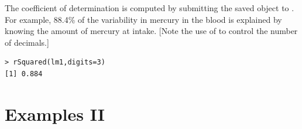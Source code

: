 \documentclass[10pt,openany]{book}\usepackage[]{graphicx}\usepackage[]{color}
\makeatletter
\newenvironment{kframe}{%
 \def\at@end@of@kframe{}%
 \ifinner\ifhmode%
  \def\at@end@of@kframe{\end{minipage}}%
  \begin{minipage}{\columnwidth}%
 \fi\fi%
 \def\FrameCommand##1{\hskip\@totalleftmargin \hskip-\fboxsep
 \colorbox{shadecolor}{##1}\hskip-\fboxsep
     \hskip-\linewidth \hskip-\@totalleftmargin \hskip\columnwidth}%
 \MakeFramed {\advance\hsize-\width
   \@totalleftmargin\z@ \linewidth\hsize
   \@setminipage}}%
 {\par\unskip\endMakeFramed%
 \at@end@of@kframe}
\newenvironment{knitrout}{}{} %
\makeatother
\begin{document}

The coefficient of determination is computed by submitting the saved  object to . For example, 88.4\% of the variability in mercury in the blood is explained by knowing the amount of mercury at intake. [Note the use of  to control the number of decimals.]
\begin{knitrout}
\color{fgcolor}\begin{kframe}
\begin{verbatim}
> rSquared(lm1,digits=3)
[1] 0.884
\end{verbatim}
\end{kframe}
\end{knitrout}

\vspace{-8pt}
\section{Examples II}
\vspace{-12pt}
\end{document}
